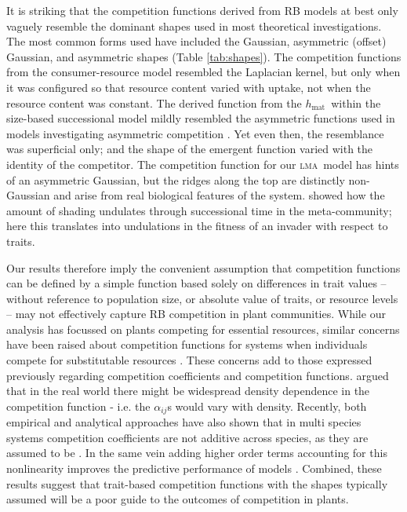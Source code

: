 \documentclass[a4paper,11pt]{article}
\newcommand{\hmat}{\ensuremath{h_{\text{mat}}}}
\newcommand{\lma}{\textsc{lma}}
\begin{document}
It is striking that the competition functions derived from RB models at best only vaguely resemble the dominant shapes used in most theoretical investigations. The most common forms used have included the Gaussian, asymmetric (offset) Gaussian, and asymmetric shapes (Table \ref{tab:shapes}). The competition functions from the consumer-resource model resembled the Laplacian kernel, but only when it was configured so that resource content varied with uptake, not when the resource content was constant. The derived function from the \hmat\ within the size-based successional model mildly resembled the asymmetric functions used in models investigating asymmetric competition \citep{Law-1997, Geritz-1999, Kisdi-1999, Calcagno-2006}. Yet even then, the resemblance was superficial only; and the shape of the emergent function varied with the identity of the competitor. The competition function for our \lma\ model has hints of an asymmetric Gaussian, but the ridges along the top are distinctly non-Gaussian and arise from real biological features of the system. \citet{Falster-2011} showed how the amount of shading undulates through successional time in the meta-community; here this translates into undulations in the fitness of an invader with respect to traits.

Our results therefore imply the convenient assumption that competition functions can be defined by a simple function based solely on differences in trait values -- without reference to population size, or absolute value of traits, or resource levels -- may not effectively capture RB competition in plant communities. While our analysis has focussed on plants competing for essential resources, similar concerns have been raised about competition functions for systems when individuals compete for substitutable resources \citep{Abrams-2008,Song-2019}. These concerns add to those expressed previously regarding competition coefficients and competition functions. \citet{Abrams-1980} argued that in the real world there might be widespread density dependence in the competition function - i.e. the $\alpha_{ij}$s would vary with density. Recently, both empirical and analytical approaches have also shown that in multi species systems competition coefficients are not additive across species, as they are assumed to be \citep{Mayfield-2017,Levine-2017, Letten-2019}. In the same vein adding higher order terms accounting for this nonlinearity improves the predictive performance of models \citep{Letten-2019}. Combined, these results suggest that trait-based competition functions with the shapes typically assumed will be a poor guide to the outcomes of competition in plants.
\end{document}
